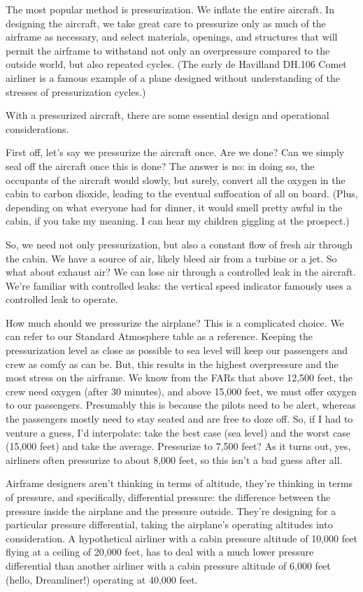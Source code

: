 The most popular method is pressurization. We inflate the entire aircraft. In designing the aircraft, we take great care to pressurize only as much of the airframe as necessary, and select materials, openings, and structures that will permit the airframe to withstand not only an overpressure compared to the outside world, but also repeated cycles. (The early de Havilland DH.106 Comet airliner is a famous example of a plane designed without understanding of the stresses of pressurization cycles.)

With a pressurized aircraft, there are some essential design and operational considerations.

First off, let's say we pressurize the aircraft once. Are we done? Can we simply seal off the aircraft once this is done? The answer is no: in doing so, the occupants of the aircraft would slowly, but surely, convert all the oxygen in the cabin to carbon dioxide, leading to the eventual suffocation of all on board. (Plus, depending on what everyone had for dinner, it would smell pretty awful in the cabin, if you take my meaning. I can hear my children giggling at the prospect.)

So, we need not only pressurization, but also a constant flow of fresh air through the cabin. We have a source of air, likely bleed air from a turbine or a jet. So what about exhaust air? We can lose air through a controlled leak in the aircraft. We're familiar with controlled leaks: the vertical speed indicator famously uses a controlled leak to operate.

How much should we pressurize the airplane? This is a complicated choice. We can refer to our Standard Atmosphere table as a reference. Keeping the pressurization level as close as possible to sea level will keep our passengers and crew as comfy as can be. But, this results in the highest overpressure and the most stress on the airframe. We know from the FARs that above 12,500 feet, the crew need oxygen (after 30 minutes), and above 15,000 feet, we must offer oxygen to our passengers. Presumably this is because the pilots need to be alert, whereas the passengers mostly need to stay seated and are free to doze off. So, if I had to venture a guess, I'd interpolate: take the best case (sea level) and the worst case (15,000 feet) and take the average. Pressurize to 7,500 feet? As it turns out, yes, airliners often pressurize to about 8,000 feet, so this isn't a bad guess after all.

Airframe designers aren't thinking in terms of altitude, they're thinking in terms of pressure, and specifically, differential pressure: the difference between the pressure inside the airplane and the pressure outside. They're designing for a particular pressure differential, taking the airplane's operating altitudes into consideration. A hypothetical airliner with a cabin pressure altitude of 10,000 feet flying at a ceiling of 20,000 feet, has to deal with a much lower pressure differential than another airliner with a cabin pressure altitude of 6,000 feet (hello, Dreamliner!) operating at 40,000 feet.


